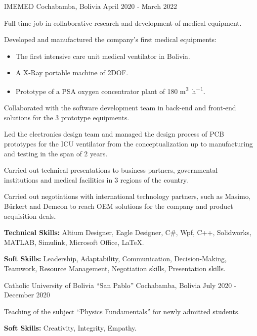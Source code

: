 \begin{cventries}
    {IMEMED}
    {Cochabamba, Bolivia}
    {April 2020 - March 2022}
    {
      \begin{cvitems}
        \item Full time job in collaborative research and development
        of medical equipment.
        \item Developed and manufactured the company's first medical
        equipments:
        \begin{itemize}
          \item[\checkmark] The first intensive care unit medical
          ventilator in Bolivia.
          \item[\checkmark] A X-Ray portable machine of 2DOF.
          \item[\checkmark] Prototype of a PSA oxygen concentrator
          plant of 180 \unit{m^{3}.h^{-1}}.
        \end{itemize}
        \item Collaborated with the software development team in
        back-end and front-end solutions for the 3 prototype
        equipments.
        \item Led the electronics design team and managed the design
        process of PCB prototypes for the ICU ventilator from the
        conceptualization up to manufacturing and testing in the span
        of 2 years.
        \item Carried out technical presentations to business
        partners, governmental institutions and medical facilities in
        3 regions of the country.
        \item Carried out negotiations with international technology
        partners, such as Masimo, B\"urkert and Demcon to reach OEM
        solutions for the company and product acquisition deals.
        \item \textbf{Technical Skills:} Altium Designer, Eagle
        Designer, C\#, Wpf, C++, Solidworks, MATLAB, Simulink,
        Microsoft Office, \LaTeX.
        \item \textbf{Soft Skills:} Leadership, Adaptability,
        Communication, Decision-Making, Teamwork, Resource Management,
        Negotiation skills, Presentation skills.
      \end{cvitems}
    }

    {Catholic University of Bolivia ``San Pablo''}
    {Cochabamba, Bolivia}
    {July 2020 - December 2020}
    {
      \begin{cvitems}
        \item Teaching of the subject ``Physics Fundamentals'' for
        newly admitted students.
        \item \textbf{Soft Skills:} Creativity, Integrity, Empathy.
      \end{cvitems}
    }


\end{cventries}
